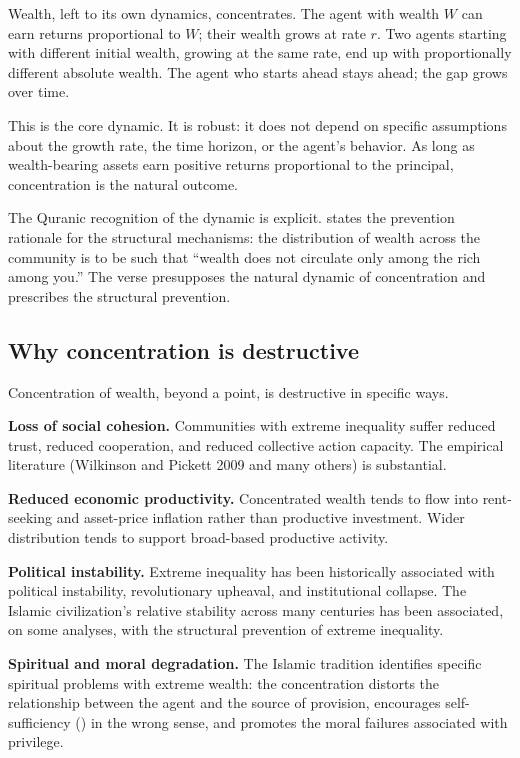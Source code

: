 Wealth, left to its own dynamics, concentrates. The agent with
wealth $W$ can earn returns proportional to $W$; their wealth
grows at rate $r$. Two agents starting with different initial
wealth, growing at the same rate, end up with proportionally
different absolute wealth. The agent who starts ahead stays ahead;
the gap grows over time.

This is the core dynamic. It is robust: it does not depend on
specific assumptions about the growth rate, the time horizon, or
the agent's behavior. As long as wealth-bearing assets earn
positive returns proportional to the principal, concentration is
the natural outcome.

The Quranic recognition of the dynamic is explicit. 
states the prevention rationale for the structural mechanisms: the
distribution of wealth across the community is to be such that
``wealth does not circulate only among the rich among you.'' The
verse presupposes the natural dynamic of concentration and
prescribes the structural prevention.

\subsection{Why concentration is destructive}

Concentration of wealth, beyond a point, is destructive in
specific ways.

\textbf{Loss of social cohesion.} Communities with extreme
inequality suffer reduced trust, reduced cooperation, and reduced
collective action capacity. The empirical literature (Wilkinson and
Pickett 2009 and many others) is substantial.

\textbf{Reduced economic productivity.} Concentrated wealth tends
to flow into rent-seeking and asset-price inflation rather than
productive investment. Wider distribution tends to support
broad-based productive activity.

\textbf{Political instability.} Extreme inequality has been
historically associated with political instability, revolutionary
upheaval, and institutional collapse. The Islamic civilization's
relative stability across many centuries has been associated, on
some analyses, with the structural prevention of extreme
inequality.

\textbf{Spiritual and moral degradation.} The Islamic tradition
identifies specific spiritual problems with extreme wealth: the
concentration distorts the relationship between the agent and the
source of provision, encourages self-sufficiency ()
in the wrong sense, and promotes the moral failures associated
with privilege.

